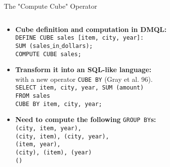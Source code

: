 \begin{frame}{The "Compute Cube" Operator}
  \begin{columns}
    \begin{column}{0.6\textwidth}
      \vspace{-4.8cm}
      \begin{itemize}
      \item \textbf{Cube definition and computation in DMQL:} \\
        \texttt{DEFINE CUBE sales [item, city, year]:}\\
        \texttt{SUM (sales$\_$in$\_$dollars);}\\
        \texttt{COMPUTE CUBE sales;}
      \item \textbf{Transform it into an SQL-like language:}\\
        with a new operator \texttt{CUBE BY} (Gray et al. 96).\\
        \texttt{SELECT item, city, year, SUM (amount)}\\
        \texttt{FROM sales}\\
        \texttt{CUBE BY item, city, year;}
      \item \textbf{Need to compute the following} \texttt{GROUP BY}\textbf{s:}\\
        \texttt{(city, item, year),}\\
        \texttt{(city, item), (city, year),}\\
        \texttt{(item, year),}\\
        \texttt{(city), (item), (year)}\\
        \texttt{()}
      \end{itemize}
    \end{column}
    \begin{column}{0.3\textwidth}  %
    \end{column}
  \end{columns}
\end{frame}

